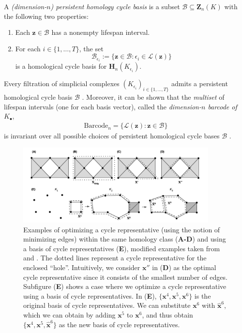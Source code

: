 \documentclass[11pt,onecolumn]{article}
\newcommand{\Homologies}[0]{\mathbf{H}}
\newcommand{\Cycles}[0]{\mathbf{Z}}
\newcommand{\optimalrep}{\mathbf{x}}
\newcommand{\cycle}{{\mathbf z}}
\newcommand{\barcode}{\mathrm{Barcode}}
\newcommand{\persinterval}{\mathcal{L}}
\newcommand{\hcyclebasis}{\mathcal B}
\theoremstyle{plain}
\theoremstyle{definition}
\begin{document}
A \emph{(dimension-$n$) persistent homology cycle basis} is a subset $\hcyclebasis \subseteq \Cycles_n(K)$ with the following two properties:
    \begin{enumerate}
    \item Each $\cycle \in \hcyclebasis$ has a nonempty lifespan interval.
    \item For each $i \in \{1, \ldots, T\}$, the set 
        $$
        \hcyclebasis_{\epsilon_i} 
        := 
        \{\cycle \in \hcyclebasis : \epsilon_i \in \persinterval(\cycle) \}
        $$
    is a homological cycle basis for $\Homologies_n(K_{\epsilon_i})$.
    \end{enumerate}
 
 
Every filtration of simplicial complexes $ (K_{\epsilon_i})_{i \in\{ 1, \ldots, T\}}$ admits a  persistent homological cycle basis  $\hcyclebasis$ \cite{zomorodiancarlssoncomputingph}.  
Moreover, it can be shown that the \emph{multiset} of lifespan intervals (one for each basis vector), called the \emph{dimension-$n$ barcode of $K_\bullet$},
    \begin{align*}
        \barcode_n = 
        \{ \persinterval(\cycle) : \cycle \in \hcyclebasis \}
    \end{align*}
is invariant over all possible choices of persistent homological cycle bases $\hcyclebasis$ \cite{zomorodiancarlssoncomputingph}.  




\begin{figure}[h!]
\begin{center}
\includegraphics[width=0.9\textwidth]{figures/examples.jpg} 
\end{center}
\caption{Examples of optimizing a cycle representative (using the notion of minimizing edges) within the same homology class (\textbf{A-D}) and using a basis of cycle representatives (\textbf{E}), modified examples taken from \cite{Escolar2016} and \cite{Obayashi2018}. The dotted lines represent a cycle representative for the enclosed ``hole''. Intuitively, we consider $\optimalrep''$ in (\textbf{D}) as the optimal cycle representative since it consists of the smallest number of edges. Subfigure (\textbf{E}) shows a case where we optimize a cycle representative using a basis of cycle representatives. In (\textbf{E}), $\{\optimalrep^4, \optimalrep^5, \optimalrep^6\}$ is the original basis of cycle representatives. We can substitute $\optimalrep^6$ with $\hat{\optimalrep}^6$, which we can obtain by adding $\optimalrep^5$ to $\optimalrep^6$, and thus obtain $\{\optimalrep^4, \optimalrep^5, \hat{\optimalrep}^6\}$ as the new basis of cycle representatives.}\label{fig:example-optimal}
\end{figure}
\end{document}
